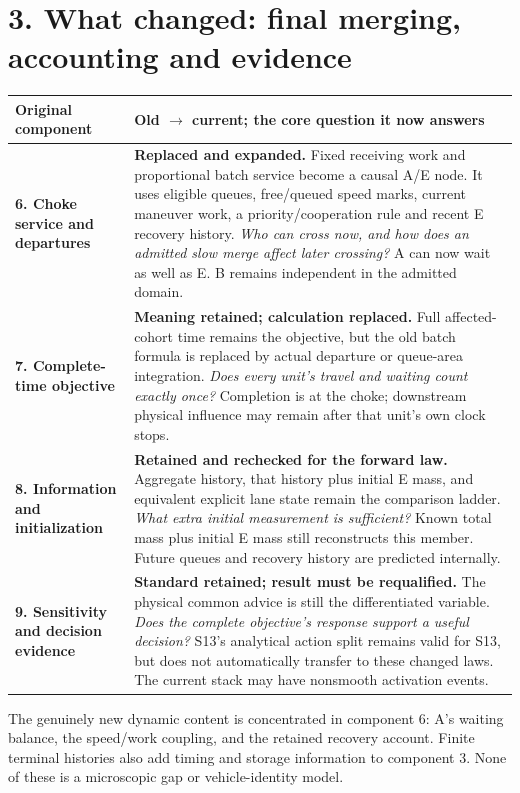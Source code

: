 \documentclass[11pt,a4paper]{article}
\begin{document}
\newpage
\section*{3. What changed: final merging, accounting and evidence}
\begin{tabular}{>{\raggedright\arraybackslash}p{31mm}>{\raggedright\arraybackslash}p{119mm}}
\toprule
Original component & Old $\to$ current; the core question it now answers\\
\midrule
\textbf{6. Choke service and departures} &
\textbf{Replaced and expanded.} Fixed receiving work and proportional
batch service become a causal A/E node. It uses eligible queues, free/queued
speed marks, current maneuver work, a priority/cooperation rule and recent
E recovery history. \emph{Who can cross now, and how does an admitted slow
merge affect later crossing?} A can now wait as well as E. B remains
independent in the admitted domain.\\[8pt]
\textbf{7. Complete-time objective} &
\textbf{Meaning retained; calculation replaced.} Full affected-cohort time
remains the objective, but the old batch formula is replaced by actual
departure or queue-area integration. \emph{Does every unit's travel and
waiting count exactly once?} Completion is at the choke; downstream
physical influence may remain after that unit's own clock stops.\\[8pt]
\textbf{8. Information and initialization} &
\textbf{Retained and rechecked for the forward law.} Aggregate history,
that history plus initial E mass, and equivalent explicit lane state remain
the comparison ladder. \emph{What extra initial measurement is sufficient?}
Known total mass plus initial E mass still reconstructs this member.
Future queues and recovery history are predicted internally.\\[8pt]
\textbf{9. Sensitivity and decision evidence} &
\textbf{Standard retained; result must be requalified.} The physical common
advice is still the differentiated variable. \emph{Does the complete
objective's response support a useful decision?} S13's analytical action
split remains valid for S13, but does not automatically transfer to these
changed laws. The current stack may have nonsmooth activation events.\\
\bottomrule
\end{tabular}

The genuinely new dynamic content is concentrated in component 6: A's
waiting balance, the speed/work coupling, and the retained recovery account.
Finite terminal histories also add timing and storage information to
component 3. None of these is a microscopic gap or vehicle-identity model.
\end{document}
